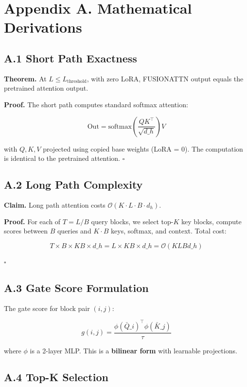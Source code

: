 \section{Appendix A. Mathematical Derivations}

\subsection{A.1 Short Path Exactness}

\textbf{Theorem.} At $L \leq L_\text{threshold}$, with zero LoRA, FUSIONATTN 
output equals the pretrained attention output.

\textbf{Proof.} The short path computes standard softmax attention:

\[
\text{Out} = \text{softmax}\!\left(\frac{Q K^\top}{\sqrt{d\_h}}\right) V
\tag{A.1}
\]

with $Q, K, V$ projected using copied base weights (LoRA = 0). The 
computation is identical to the pretrained attention. $\square$

\subsection{A.2 Long Path Complexity}

\textbf{Claim.} Long path attention costs $\mathcal{O}(K \cdot L \cdot B \cdot d_h)$.

\textbf{Proof.} For each of $T = L/B$ query blocks, we select top-$K$ key 
blocks, compute scores between $B$ queries and $K \cdot B$ keys, softmax, 
and context. Total cost:

\[
T \times B \times K B \times d\_h = L \times K B \times d\_h = \mathcal{O}(K L B d\_h)
\tag{A.2}
\]

$\square$

\subsection{A.3 Gate Score Formulation}

The gate score for block pair $(i, j)$:

\[
g(i, j) = \frac{\phi(\bar{Q}\_i)^\top \phi(\bar{K}\_j)}{\tau}
\tag{A.3}
\]

where $\phi$ is a 2-layer MLP. This is a \textbf{bilinear form} with learnable 
projections.

\subsection{A.4 Top-K Selection}

